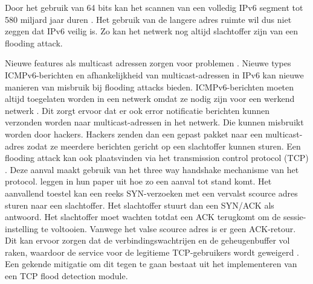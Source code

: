 Door het gebruik van 64 bits kan het scannen van een volledig IPv6 segment tot 580 miljard jaar duren \autocite{boek1}. Het gebruik van de langere adres ruimte wil dus niet zeggen dat IPv6 veilig is. Zo kan het netwerk nog altijd slachtoffer zijn van een flooding attack. 

Nieuwe features als multicast adressen zorgen voor problemen \autocite{1619968}. Nieuwe types ICMPv6-berichten en afhankelijkheid van multicast-adressen in IPv6 kan nieuwe manieren van misbruik bij flooding attacks bieden. ICMPv6-berichten moeten altijd toegelaten worden in een netwerk omdat ze nodig zijn voor een werkend netwerk \autocite{DURDAGI20105285}. Dit zorgt ervoor dat er ook error notificatie berichten kunnen verzonden worden naar multicast-adressen in het netwerk. Die kunnen misbruikt worden door hackers. Hackers zenden dan een gepast pakket naar een multicast-adres zodat ze meerdere berichten gericht op een slachtoffer kunnen sturen.
Een flooding attack kan ook plaatsvinden via het transmission control protocol (TCP) \autocite{gao2014detecting}. Deze aanval maakt gebruik van het  three way handshake mechanisme van het protocol. \textcite{gao2014detecting} leggen in hun paper uit hoe zo een aanval tot stand komt. Het aanvallend toestel kan een reeks SYN-verzoeken met een vervalst scource adres sturen naar een slachtoffer. Het slachtoffer stuurt dan een SYN/ACK als antwoord. Het slachtoffer moet wachten totdat een ACK terugkomt om de sessie-instelling te voltooien. Vanwege het valse scource adres is er geen ACK-retour. Dit kan ervoor zorgen dat de verbindingswachtrijen en de geheugenbuffer vol raken, waardoor de service voor de legitieme TCP-gebruikers wordt geweigerd \autocite{gao2014detecting}. Een gekende mitigatie om dit tegen te gaan bestaat uit het implementeren van een TCP flood detection module.

